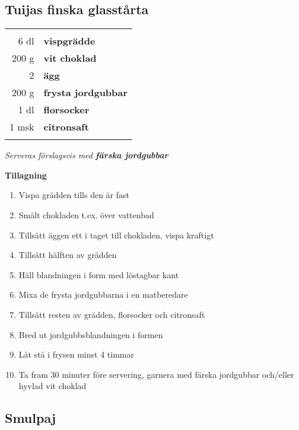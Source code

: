 \documentclass[a4paper,12pt]{article}
\newcommand{\tillb}[1]{\noindent \textit{Serveras förslagsvis med \textbf{#1}} \vspace{1cm}}
\begin{document}
\clearpage

\subsection{Tuijas finska glasstårta}

\begin{table}[H]
	\begin{tabular}{rl}
	\hline
	&\\
		6 dl & \textbf{vispgrädde}\\
		200 g & \textbf{vit choklad}\\
		2 & \textbf{ägg}\\
		200 g & \textbf{frysta jordgubbar}\\
		1 dl & \textbf{florsocker}\\
		1 msk & \textbf{citronsaft}\\
	&\\
	\hline
	\end{tabular}
\end{table}

\tillb{färska jordgubbar}

\begin{multicols*}{2}

\noindent \textbf{Tillagning}
\begin{enumerate}
	\itemsep0cm
	\item Vispa grädden tills den är fast
	\item Smält chokladen t.ex. över vatten\-bad
	\item Tillsätt äggen ett i taget till chokladen, vispa kraftigt
	\item Tillsätt hälften av grädden
	\item Häll blandningen i form med löstagbar kant
	\item Mixa de frysta jordgubbarna i en matberedare
	\item Tillsätt resten av grädden, florsocker och citronsaft
	\item Bred ut jordgubbsblandningen i formen
	\item Låt stå i frysen minst 4 timmar
	\item Ta fram 30 minuter före \mbox{servering}, garnera med färska jord\-gubbar och/eller hyvlad vit choklad
\end{enumerate}

\end{multicols*}

\clearpage

\subsection{Smulpaj}
\end{document}
